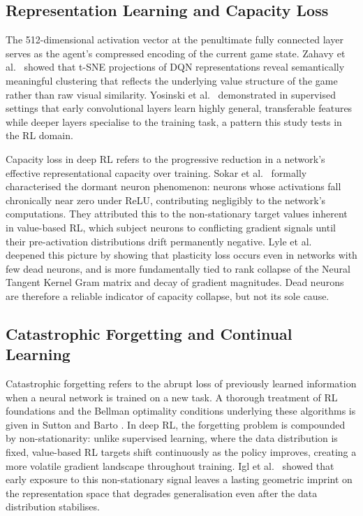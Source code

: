 \documentclass[a4paper]{article}
\begin{document}
\subsection{Representation Learning and Capacity Loss}

The 512-dimensional activation vector at the penultimate fully connected layer serves as the
agent's compressed encoding of the current game state. Zahavy et al.\ \cite{zahavy2016graying}
showed that t-SNE projections of DQN representations reveal semantically meaningful
clustering that reflects the underlying value structure of the game rather than raw visual
similarity. Yosinski et al.\ \cite{yosinski2014transferable} demonstrated in supervised
settings that early convolutional layers learn highly general, transferable features while
deeper layers specialise to the training task, a pattern this study tests in the RL domain.

Capacity loss in deep RL refers to the progressive reduction in a network's effective
representational capacity over training. Sokar et al.\ \cite{sokar2023dormant} formally
characterised the dormant neuron phenomenon: neurons whose activations fall chronically near
zero under ReLU, contributing negligibly to the network's computations. They attributed this
to the non-stationary target values inherent in value-based RL, which subject neurons to
conflicting gradient signals until their pre-activation distributions drift permanently
negative. Lyle et al.\ \cite{lyle2022understanding,lyle2023plasticity} deepened this
picture by showing that plasticity loss occurs even in networks with few dead neurons, and
is more fundamentally tied to rank collapse of the Neural Tangent Kernel Gram matrix and
decay of gradient magnitudes. Dead neurons are therefore a reliable indicator of capacity
collapse, but not its sole cause.

\subsection{Catastrophic Forgetting and Continual Learning}

Catastrophic forgetting \cite{mccloskey1989catastrophic} refers to the abrupt loss of
previously learned information when a neural network is trained on a new task. A thorough
treatment of RL foundations and the Bellman optimality conditions underlying these algorithms
is given in Sutton and Barto \cite{sutton2018reinforcement}. In deep RL, the forgetting
problem is compounded by non-stationarity: unlike supervised learning, where the data
distribution is fixed, value-based RL targets shift continuously as the policy improves,
creating a more volatile gradient landscape throughout training. Igl et al.\ \cite{igl2021transient}
showed that early exposure to this non-stationary signal leaves a lasting geometric imprint
on the representation space that degrades generalisation even after the data distribution
stabilises.
\end{document}
